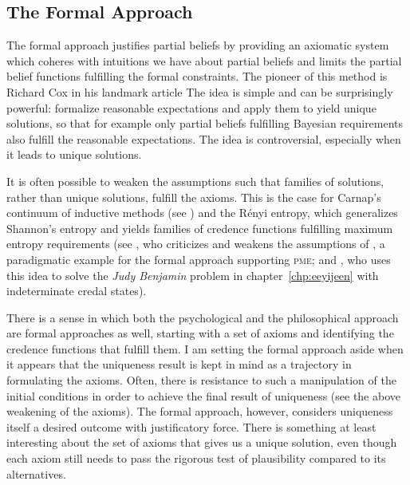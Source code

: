 \documentclass[phd,12pt,oneside]{ubcthesis}
\begin{document}
\subsection{The Formal Approach}
\label{subsec:ahghuato}

The formal approach justifies partial beliefs by providing an
axiomatic system which coheres with intuitions we have about partial
beliefs and limits the partial belief functions fulfilling the formal
constraints. The pioneer of this method is Richard Cox in his landmark
article  The
idea is simple and can be surprisingly powerful: formalize reasonable
expectations and apply them to yield unique solutions, so that for
example only partial beliefs fulfilling Bayesian requirements also
fulfill the reasonable expectations. The idea is controversial,
especially when it leads to unique solutions.

It is often possible to weaken the assumptions such that families of
solutions, rather than unique solutions, fulfill the axioms. This is
the case for Carnap's con\-ti\-nuum of inductive methods (see
) and the R{\'e}nyi entropy, which generalizes
Shannon's entropy and yields families of credence functions fulfilling
maximum entropy requirements (see , who
criticizes and weakens the assumptions of ,
a paradigmatic example for the formal approach supporting
\textsc{pme}; and , who uses this idea to solve
the \emph{Judy Benjamin} problem in chapter~\ref{chp:eeyijeen} with
indeterminate credal states).

There is a sense in which both the psychological and the philosophical
approach are formal approaches as well, starting with a set of axioms
and identifying the credence functions that fulfill them. I am setting
the formal approach aside when it appears that the uniqueness result
is kept in mind as a trajectory in formulating the axioms. Often,
there is resistance to such a manipulation of the initial conditions
in order to achieve the final result of uniqueness (see the above
weakening of the axioms). The formal approach, however, considers
uniqueness itself a desired outcome with justificatory force. There is
something at least interesting about the set of axioms that gives us a
unique solution, even though each axiom still needs to pass the
rigorous test of plausibility compared to its alternatives. 
\end{document}
